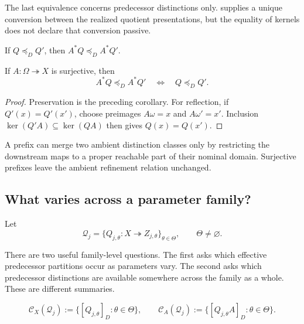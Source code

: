 The last equivalence concerns predecessor distinctions only.  supplies a unique conversion between the realized quotient presentations, but the equality of kernels does not declare that conversion passive.

\begin{corollary}\label{cor:recutting-monotone-v13}
If $Q\preceq_DQ'$, then $A^*Q\preceq_DA^*Q'$.
\end{corollary}

\begin{proposition}\label{prop:surjective-reflection-v13}
If $A:\Omega\twoheadrightarrow X$ is surjective, then
\[
\boxed{
A^*Q\preceq_DA^*Q'
\quad\Longleftrightarrow\quad
Q\preceq_DQ'.
}
\]
\end{proposition}

\begin{proof}
Preservation is the preceding corollary. For reflection, if $Q'(x)=Q'(x')$, choose preimages $A\omega=x$ and $A\omega'=x'$. Inclusion $\ker(Q'A)\subseteq\ker(QA)$ then gives $Q(x)=Q(x')$.
\end{proof}

A prefix can merge two ambient distinction classes only by restricting the downstream maps to a proper reachable part of their nominal domain. Surjective prefixes leave the ambient refinement relation unchanged.

\subsection{What varies across a parameter family?}

Let
\[
\mathcal Q_j
=
\{Q_{j,\theta}:X\twoheadrightarrow Z_{j,\theta}\}_{\theta\in\Theta},
\qquad \Theta\neq\varnothing.
\]

There are two useful family-level questions. The first asks which effective predecessor partitions occur as parameters vary. The second asks which predecessor distinctions are available somewhere across the family as a whole. These are different summaries.

\begin{definition}\label{def:distinction-class-sets-v13}
\[
\mathcal C_X(\mathcal Q_j)
:=
\{[Q_{j,\theta}]_D:\theta\in\Theta\},
\qquad
\boxed{
\mathcal C_A(\mathcal Q_j)
:=
\{[Q_{j,\theta}A]_D:\theta\in\Theta\}.
}
\]
\end{definition}


